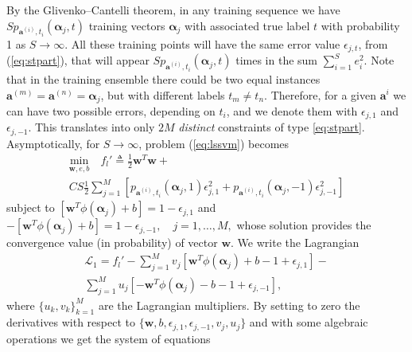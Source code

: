 \documentclass[draftcls,journal,onecolumn]{IEEEtran}
\begin{document}
	By the Glivenko–Cantelli theorem, in any training sequence we have $Sp_{\bm{a}^{(i)},t_i}(\bm{\alpha}_j,t)$ training vectors $\bm{\alpha}_j$ with associated true label $t$ with probability 1 as $S\rightarrow \infty$.
	All these training points will have the same {error value $\epsilon_{j,t}$}, from (\ref{eq:stpart}), that will appear $Sp_{\bm{a}^{(i)},t_i}(\bm{\alpha}_j,t)$ times in the sum $\sum_{i=1}^{S} e_i^2$.
	Note that in the training ensemble there could be two equal instances $\bm{a}^{(m)}=\bm{a}^{(n)}=\bm{\alpha}_j$, but with different labels $t_m \neq t_n$. Therefore, {for a given $\bm{a}^{i}$} we can have two possible {errors}, depending on $t_i$, and we denote them with $\epsilon_{j,1}$ and $\epsilon_{j,-1}$.
	This translates into only $2M$ \textit{distinct} constraints of type \eqref{eq:stpart}.
	Asymptotically, for $S \to \infty$, problem (\ref{eq:lssvm}) becomes
		\begin{equation}
		\label{eq:lssvm2}
		\begin{split}
		\underset{\bm{w},e,b}{\text{min}} \quad f_l' \triangleq 
		\frac{1}{2} \bm{w}^T \bm{w} + \\ C S \frac{1}{2} \sum_{j=1}^M [p_{\bm{a}^{(i)},t_i}(\bm{\alpha}_j,1) \epsilon_{j,1}^2 + p_{\bm{a}^{(i)},t_i}(\bm{\alpha}_j,-1) \epsilon_{j,-1}^2]  
		\end{split}
		\end{equation}
		subject to 
$
		[\bm{w}^T \phi (\bm{\alpha}_j) + b] = 1- \epsilon_{j,1}
$
and
$
-[\bm{w}^T \phi (\bm{\alpha}_j) + b] = 1- \epsilon_{j,-1},\quad j = 1 ,\dots,M,
$
	whose solution provides the convergence value (in probability) of vector $\bm{w}$. We write the Lagrangian
	\begin{equation}
	\begin{split}
	\mathcal{L}_1 = f_l' - \sum_{j=1}^{M} v_j \left[ \bm{w}^T \phi (\bm{\alpha}_j) + b - 1 + \epsilon_{j,1} \right] 
	- \\
	\sum_{j=1}^{M} u_j \left[- \bm{w}^T  \phi (\bm{\alpha}_j) - b  - 1 + \epsilon_{j,-1} \right], 
	\end{split}
	\end{equation}
	where $\{u_k,v_k\}_{k=1}^{M}$ are the Lagrangian multipliers. By setting to zero the derivatives with respect to $\{\bm{w},b,\epsilon_{j,1},\epsilon_{j,-1}, v_j,u_j\}$ and with some algebraic operations we get the system of equations
\end{document}
